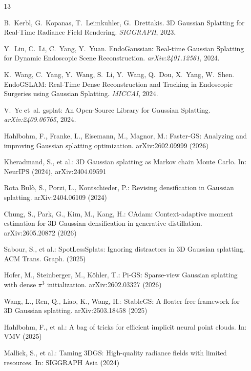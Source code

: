 \documentclass[runningheads]{llncs}
\begin{document}
\begin{thebibliography}{13}

B.~Kerbl, G.~Kopanas, T.~Leimkuhler, G.~Drettakis.
\newblock 3D Gaussian Splatting for Real-Time Radiance Field Rendering.
\newblock \emph{SIGGRAPH}, 2023.

Y.~Liu, C.~Li, C.~Yang, Y.~Yuan.
\newblock EndoGaussian: Real-time Gaussian Splatting for Dynamic Endoscopic Scene Reconstruction.
\newblock \emph{arXiv:2401.12561}, 2024.

K.~Wang, C.~Yang, Y.~Wang, S.~Li, Y.~Wang, Q.~Dou, X.~Yang, W.~Shen.
\newblock EndoGSLAM: Real-Time Dense Reconstruction and Tracking in Endoscopic Surgeries using Gaussian Splatting.
\newblock \emph{MICCAI}, 2024.

V.~Ye et~al.
\newblock gsplat: An Open-Source Library for Gaussian Splatting.
\newblock \emph{arXiv:2409.06765}, 2024.

Hahlbohm, F., Franke, L., Eisemann, M., Magnor, M.: Faster-GS: Analyzing and improving Gaussian splatting optimization. arXiv:2602.09999 (2026)

Kheradmand, S., et al.: 3D Gaussian splatting as Markov chain Monte Carlo. In: NeurIPS (2024), arXiv:2404.09591

Rota Bul\`o, S., Porzi, L., Kontschieder, P.: Revising densification in Gaussian splatting. arXiv:2404.06109 (2024)

Chung, S., Park, G., Kim, M., Kang, H.: CAdam: Context-adaptive moment estimation for 3D Gaussian densification in generative distillation. arXiv:2605.20872 (2026)

Sabour, S., et al.: SpotLessSplats: Ignoring distractors in 3D Gaussian splatting. ACM Trans. Graph. (2025)

Hofer, M., Steinberger, M., K\"ohler, T.: Pi-GS: Sparse-view Gaussian splatting with dense $\pi^3$ initialization. arXiv:2602.03327 (2026)

Wang, L., Ren, Q., Liao, K., Wang, H.: StableGS: A floater-free framework for 3D Gaussian splatting. arXiv:2503.18458 (2025)

Hahlbohm, F., et al.: A bag of tricks for efficient implicit neural point clouds. In: VMV (2025)

Mallick, S., et al.: Taming 3DGS: High-quality radiance fields with limited resources. In: SIGGRAPH Asia (2024)

\end{thebibliography}
\end{document}
